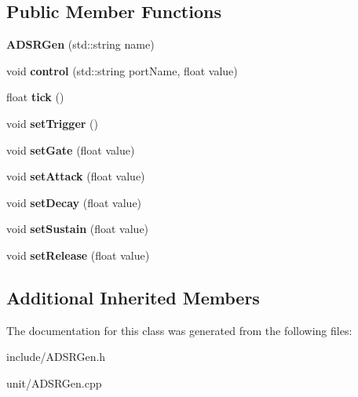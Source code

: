 \subsection*{Public Member Functions}
\begin{DoxyCompactItemize}
\item 
{\bfseries A\+D\+S\+R\+Gen} (std\+::string name)\hypertarget{classunit_1_1ADSRGen_a7e2d63eecbe51fc86a93697dd4d47964}{}\label{classunit_1_1ADSRGen_a7e2d63eecbe51fc86a93697dd4d47964}

\item 
void {\bfseries control} (std\+::string port\+Name, float value)\hypertarget{classunit_1_1ADSRGen_ac43bddd25b9a84f0ad6b299ed55f5133}{}\label{classunit_1_1ADSRGen_ac43bddd25b9a84f0ad6b299ed55f5133}

\item 
float {\bfseries tick} ()\hypertarget{classunit_1_1ADSRGen_a91a149fa5065d94dccec224b18710a24}{}\label{classunit_1_1ADSRGen_a91a149fa5065d94dccec224b18710a24}

\item 
void {\bfseries set\+Trigger} ()\hypertarget{classunit_1_1ADSRGen_a8685be5cffea6ec29dc1ebdc44402f70}{}\label{classunit_1_1ADSRGen_a8685be5cffea6ec29dc1ebdc44402f70}

\item 
void {\bfseries set\+Gate} (float value)\hypertarget{classunit_1_1ADSRGen_aee81e429433522eeb6362338fe15d551}{}\label{classunit_1_1ADSRGen_aee81e429433522eeb6362338fe15d551}

\item 
void {\bfseries set\+Attack} (float value)\hypertarget{classunit_1_1ADSRGen_a3a81f7181fa8b63f4ec5ff9da91cb8b3}{}\label{classunit_1_1ADSRGen_a3a81f7181fa8b63f4ec5ff9da91cb8b3}

\item 
void {\bfseries set\+Decay} (float value)\hypertarget{classunit_1_1ADSRGen_a14856bf0586881cbe088ab47918b7d72}{}\label{classunit_1_1ADSRGen_a14856bf0586881cbe088ab47918b7d72}

\item 
void {\bfseries set\+Sustain} (float value)\hypertarget{classunit_1_1ADSRGen_a07fa6e650dc1ffdde91fc0721d4a8dc8}{}\label{classunit_1_1ADSRGen_a07fa6e650dc1ffdde91fc0721d4a8dc8}

\item 
void {\bfseries set\+Release} (float value)\hypertarget{classunit_1_1ADSRGen_a8c2a3e60dcae34d077b5983b1584de71}{}\label{classunit_1_1ADSRGen_a8c2a3e60dcae34d077b5983b1584de71}

\end{DoxyCompactItemize}
\subsection*{Additional Inherited Members}


The documentation for this class was generated from the following files\+:\begin{DoxyCompactItemize}
\item 
include/A\+D\+S\+R\+Gen.\+h\item 
unit/A\+D\+S\+R\+Gen.\+cpp\end{DoxyCompactItemize}
